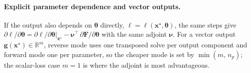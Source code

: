 \documentclass{article}
\begin{document}
\paragraph{Explicit parameter dependence and vector outputs.} If the output also depends on \(\boldsymbol{\theta}\) directly, \(\ell=\ell(\mathbf{x}^\star,\boldsymbol{\theta})\), the same steps give \(\partial\ell/\partial\boldsymbol{\theta}=\left.\partial\ell/\partial\boldsymbol{\theta}\right|_{\mathbf{x}^\star}-\boldsymbol{\nu}^{\top}\,\partial\mathbf{F}/\partial\boldsymbol{\theta}\) with the same adjoint \(\boldsymbol{\nu}\). For a vector output \(\mathbf{g}(\mathbf{x}^\star)\in\mathbb{R}^{m}\), reverse mode uses one transposed solve per output component and forward mode one per parameter, so the cheaper mode is set by \(\min(m,\,n_p)\); the scalar-loss case \(m=1\) is where the adjoint is most advantageous.
\end{document}
